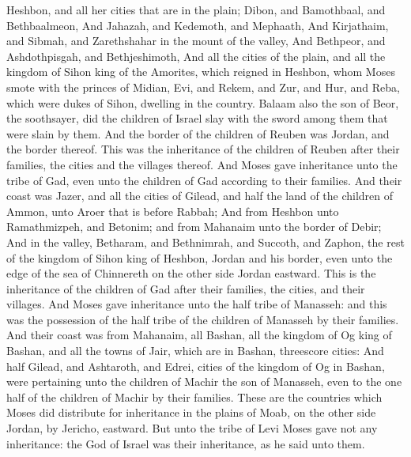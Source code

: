 \begin{biblechapter}
\verse Heshbon, and all her cities that are in the plain; Dibon, and Bamothbaal, and Bethbaalmeon,
\verse And Jahazah, and Kedemoth, and Mephaath,
\verse And Kirjathaim, and Sibmah, and Zarethshahar in the mount of the valley,
\verse And Bethpeor, and Ashdothpisgah, and Bethjeshimoth,
\verse And all the cities of the plain, and all the kingdom of Sihon king of the Amorites, which reigned in Heshbon, whom Moses smote with the princes of Midian, Evi, and Rekem, and Zur, and Hur, and Reba, which were dukes of Sihon, dwelling in the country.
\verse Balaam also the son of Beor, the soothsayer, did the children of Israel slay with the sword among them that were slain by them.
\verse And the border of the children of Reuben was Jordan, and the border thereof. This was the inheritance of the children of Reuben after their families, the cities and the villages thereof.
\verse And Moses gave inheritance unto the tribe of Gad, even unto the children of Gad according to their families.
\verse And their coast was Jazer, and all the cities of Gilead, and half the land of the children of Ammon, unto Aroer that is before Rabbah;
\verse And from Heshbon unto Ramathmizpeh, and Betonim; and from Mahanaim unto the border of Debir;
\verse And in the valley, Betharam, and Bethnimrah, and Succoth, and Zaphon, the rest of the kingdom of Sihon king of Heshbon, Jordan and his border, even unto the edge of the sea of Chinnereth on the other side Jordan eastward.
\verse This is the inheritance of the children of Gad after their families, the cities, and their villages.
\verse And Moses gave inheritance unto the half tribe of Manasseh: and this was the possession of the half tribe of the children of Manasseh by their families.
\verse And their coast was from Mahanaim, all Bashan, all the kingdom of Og king of Bashan, and all the towns of Jair, which are in Bashan, threescore cities:
\verse And half Gilead, and Ashtaroth, and Edrei, cities of the kingdom of Og in Bashan, were pertaining unto the children of Machir the son of Manasseh, even to the one half of the children of Machir by their families.
\verse These are the countries which Moses did distribute for inheritance in the plains of Moab, on the other side Jordan, by Jericho, eastward.
\verse But unto the tribe of Levi Moses gave not any inheritance: the \LORD God of Israel was their inheritance, as he said unto them.
\end{biblechapter}


